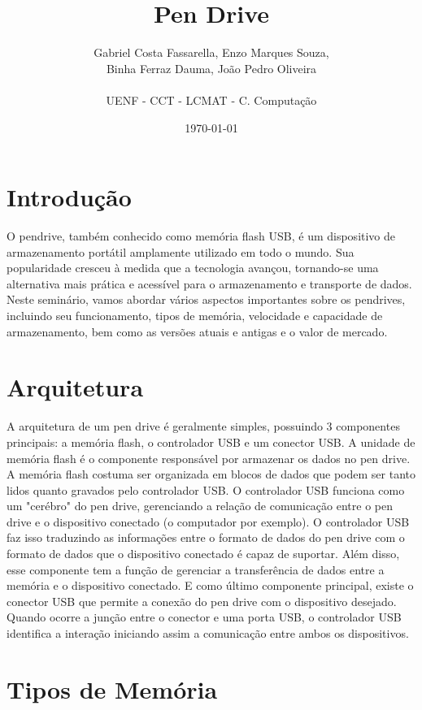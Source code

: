 \documentclass[a4paper, 12pt]{article}
\title{\textbf{Pen Drive}}
\author{Gabriel Costa Fassarella, Enzo Marques Souza, \\ Binha Ferraz Dauma, João Pedro Oliveira  \\ \\ UENF - CCT - LCMAT - C. Computação \\}
\date{\today}
\begin{document}
	\maketitle
	
	\newpage
	
	\section{Introdução}
	
	O pendrive, também conhecido como memória flash USB, é um dispositivo de armazenamento portátil amplamente utilizado em todo o mundo. Sua popularidade cresceu à medida que a tecnologia avançou, tornando-se uma alternativa mais prática e acessível para o armazenamento e transporte de dados. Neste seminário, vamos abordar vários aspectos importantes sobre os pendrives, incluindo seu funcionamento, tipos de memória, velocidade e capacidade de armazenamento, bem como as versões atuais e antigas e o valor de mercado.
	
	\section{Arquitetura}
	
	A arquitetura de um pen drive é geralmente simples, possuindo 3 componentes principais: a memória flash, o controlador USB e um conector USB.
	A unidade de memória flash é o componente responsável por armazenar os dados no pen drive. A memória flash costuma ser organizada em blocos de dados que podem ser tanto lidos quanto gravados pelo controlador USB.
	O controlador USB funciona como um "cerébro" do pen drive, gerenciando a relação de comunicação entre o pen drive e o dispositivo conectado (o computador por exemplo). O controlador USB faz isso traduzindo as informações entre o formato de dados do pen drive com o formato de dados que o dispositivo conectado é capaz de suportar. Além disso, esse componente tem a função de gerenciar a transferência de dados entre a memória e o dispositivo conectado. 
	E como último componente principal, existe o conector USB que permite a conexão do pen drive com o dispositivo desejado. Quando ocorre a junção entre o conector e uma porta USB, o controlador USB identifica a interação iniciando assim a comunicação entre ambos os dispositivos.
	
	\section{Tipos de Memória}
	
\end{document}
